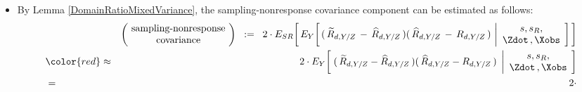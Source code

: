 \begin{itemize}
\begin{eqnarray*}
{        \dfrac{
            1}{
            \overset{{\color{white}.}}{
                \widehat{T}_{d}(s\,;\zdot)^{2}
                }
            }
        \cdot
        \left\{\,
            \left(\;
                \underset{l \in s_{R}}{\sum}
                    \left(W^{(+)}_{d,l}\right)^{2}\sigma_{l}^{2}
                \,+\,
                \underset{k \in s_{M}}{\sum}\,
                    w_{k}\,d_{k}^{2}\,\sigma_{k}^{2}
                \,\right)
            \, + \,
            \left(\,
                W^{(+)}_{d,0}
                \,+\,
                \underset{l \in s_{R}}{\sum}\;W^{(+)}_{d,l}\,\mu_{l}
                \,-\,
                \underset{k \in s_{M}}{\sum}\;w_{k}\,d_{k}\,\mu_{k}
                \,\right)^{\!2}
            \,\right\}
        }
    \end{eqnarray*}
\item
    By Lemma \ref{DomainRatioMixedVariance},
    the sampling-nonresponse covariance component can be estimated
    as follows:
    \begin{eqnarray*}
    &&
        \left(\!\begin{array}{c}
            \textnormal{sampling-nonresponse}
            \\
            \textnormal{covariance}
            \end{array}\!\right)
    \;\; := \;\;
        2
        \cdot
        E_{SR}\!\left[\,
        E_{Y}\!\left[\,
            (\,\widetilde{R}_{d,Y/Z} \,-\, \widehat{R}_{d,Y/Z}\,)(\,\widehat{R}_{d,Y/Z} \,-\, R_{d,Y/Z}\,)
            \,\left\vert
            \begin{array}{c}
                s,s_{R},
                \\
                \Zdot\,,\Xobs
                \end{array}
            \right.
            \!\right]
            \,\right]
    \\
    & {\color{red}\approx} &
        2
        \cdot
        E_{Y}\!\left[\;
            (\,\widetilde{R}_{d,Y/Z} - \widehat{R}_{d,Y/Z}\,)
            (\,  \widehat{R}_{d,Y/Z} - R_{d,Y/Z}\,)
            \;\left\vert
            \begin{array}{c}
                s,s_{R},
                \\
                \Zdot\,,\Xobs
                \end{array}
            \right.
            \!\right]
    \\
    & = &
        2
        \cdot

\end{eqnarray*}
\end{itemize}
